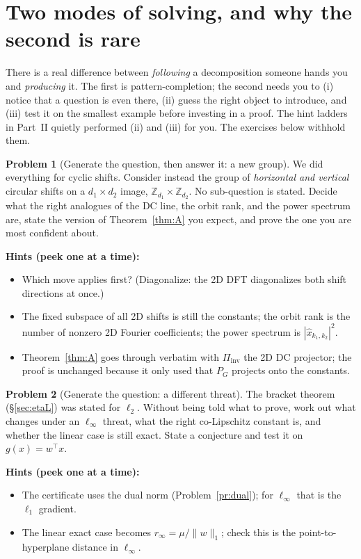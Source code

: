 \documentclass[11pt]{article}
\theoremstyle{plain}
\theoremstyle{definition}
\newtheorem{problem}{Problem}[section]
\theoremstyle{remark}
\newenvironment{hints}{\par\smallskip\noindent\textbf{\color{hintc}Hints (peek one at a time):}\begin{itemize}}{\end{itemize}\par\smallskip}
\newcommand{\Z}{\mathbb{Z}}
\newcommand{\Piinv}{\Pi_{\mathrm{inv}}}
\begin{document}
\section{Two modes of solving, and why the second is rare}

There is a real difference between \emph{following} a decomposition someone hands you and \emph{producing} it. The
first is pattern-completion; the second needs you to (i) notice that a question is even there, (ii) guess the right
object to introduce, and (iii) test it on the smallest example before investing in a proof. The hint ladders in
Part~II quietly performed (ii) and (iii) for you. The exercises below withhold them.

\begin{problem}[Generate the question, then answer it: a new group]\label{pr:newgroup}
We did everything for cyclic shifts. Consider instead the group of \emph{horizontal and vertical} circular shifts on a
$d_1\times d_2$ image, $\Z_{d_1}\times\Z_{d_2}$. No sub-question is stated. Decide what the right analogues of the DC
line, the orbit rank, and the power spectrum are, state the version of Theorem~\ref{thm:A} you expect, and prove the
one you are most confident about.
\end{problem}
\begin{hints}
\item Which move applies first? (Diagonalize: the 2D DFT diagonalizes both shift directions at once.)
\item The fixed subspace of all 2D shifts is still the constants; the orbit rank is the number of nonzero 2D Fourier
coefficients; the power spectrum is $|\hat x_{k_1,k_2}|^2$.
\item Theorem~\ref{thm:A} goes through verbatim with $\Piinv$ the 2D DC projector; the proof is unchanged because it
only used that $P_G$ projects onto the constants.
\end{hints}

\begin{problem}[Generate the question: a different threat]\label{pr:newthreat}
The bracket theorem (\S\ref{sec:etaL}) was stated for $\ell_2$. Without being told what to prove, work out what changes
under an $\ell_\infty$ threat, what the right co-Lipschitz constant is, and whether the linear case is still exact.
State a conjecture and test it on $g(x)=w^\top x$.
\end{problem}
\begin{hints}
\item The certificate uses the dual norm (Problem~\ref{pr:dual}); for $\ell_\infty$ that is the $\ell_1$ gradient.
\item The linear exact case becomes $r_\infty=\mu/\|w\|_1$; check this is the point-to-hyperplane distance in $\ell_\infty$.
\end{hints}
\end{document}
